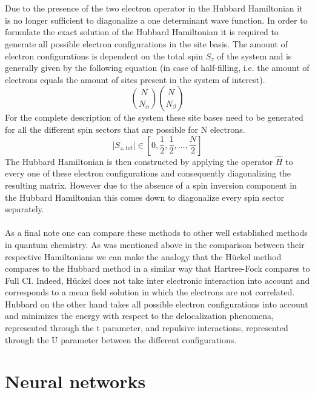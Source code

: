 \documentclass[12pt]{article}
\begin{document}
\\
\\
Due to the presence of the two electron operator in the Hubbard Hamiltonian it is no longer sufficient to diagonalize a one determinant wave function. In order to formulate the exact solution of the Hubbard Hamiltonian it is required to generate all possible electron configurations in the site basis. The amount of electron configurations is dependent on the total spin $S_z$ of the system and is generally given by the following equation (in case of half-filling, i.e. the amount of electrons equals the amount of sites present in the system of interest).
\begin{equation}
\binom{N}{N_{\alpha}}\binom{N}{N_{\beta}}
\end{equation}  
For the complete description of the system these site bases need to be generated for all the different spin sectors that are possible for N electrons.
\begin{equation}
\lvert S_{z,tot} \rvert \in \left[ 0,\frac{1}{2},\frac{1}{2}, \dots, \frac{N}{2} \right]
\end{equation}
The Hubbard Hamiltonian is then constructed by applying the operator $\hat{H}$ to every one of these electron configurations and consequently diagonalizing the resulting matrix. However due to the absence of a spin inversion component in the Hubbard Hamiltonian this comes down to diagonalize every spin sector separately.
\\
\\
As a final note one can compare these methods to other well established methods in quantum chemistry. As was mentioned above in the comparison between their respective Hamiltonians we can make the analogy that the Hückel method compares to the Hubbard method in a similar way that Hartree-Fock compares to Full CI. Indeed, Hückel does not take inter electronic interaction into account and corresponds to a mean field solution in which the electrons are not correlated. Hubbard on the other hand takes all possible electron configurations into account and minimizes the energy with respect to the delocalization phenomena, represented through the t parameter, and repulsive interactions, represented through the U parameter between the different configurations.  

\newpage
\section{Neural networks}
\end{document}
